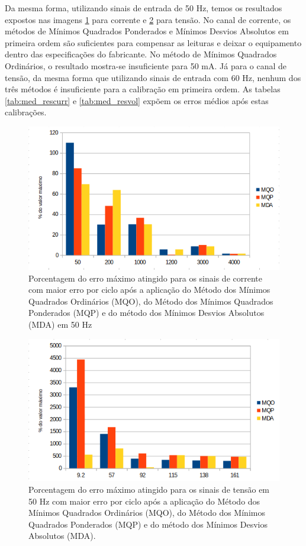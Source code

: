 Da mesma forma, utilizando sinais de entrada de 50 Hz, temos os resultados expostos nas imagens \ref{fig:res_curr50} para corrente e \ref{fig:res_volt50} para tensão. No canal de corrente, os métodos de Mínimos Quadrados Ponderados e Mínimos Desvios Absolutos em primeira ordem são suficientes para compensar as leituras e deixar o equipamento dentro das especificações do fabricante. No método de Mínimos Quadrados Ordinários, o resultado mostra-se insuficiente para 50 mA. Já para o canal de tensão, da mesma forma que utilizando sinais de entrada com 60 Hz, nenhum dos três métodos é insuficiente para a calibração em primeira ordem. As tabelas \ref{tab:med_rescurr} e \ref{tab:med_resvol} expõem os erros médios após estas calibrações.


\begin{figure}
    \caption{Porcentagem do erro máximo atingido para os sinais de corrente com maior erro por ciclo após a aplicação do Método dos Mínimos Quadrados Ordinários (MQO), do Método dos Mínimos Quadrados Ponderados (MQP) e do método dos Mínimos Desvios Absolutos (MDA) em 50 Hz}
    \label{fig:res_curr50}
    \centering
    \includegraphics[width=0.9\linewidth]{pictures/50hzIA.png}
\end{figure}

\begin{figure}
    \caption{Porcentagem do erro máximo atingido para os sinais de tensão em 50 Hz com maior erro por ciclo após a aplicação do Método dos Mínimos Quadrados Ordinários (MQO), do Método dos Mínimos Quadrados Ponderados (MQP) e do método dos Mínimos Desvios Absolutos (MDA).}
    \label{fig:res_volt50}
    \centering
    \includegraphics[width=0.9\linewidth]{pictures/50HzVC_1.png}
\end{figure}

